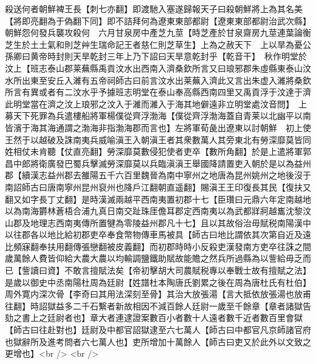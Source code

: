 殺送何者朝鮮裨王長【刺七亦翻】即渡馳入塞遂歸報天子曰殺朝鮮將上為其名美【將即亮翻為于偽翻下同】即不詰拜何為遼東東部都尉【遼東東部都尉治武次縣】朝鮮怨何發兵襲攻殺何　六月甘泉房中產芝九莖【時芝產於甘泉齋房九莖連葉論衡芝生於土土氣和則芝艸生瑞命記王者慈仁則芝草生】上為之赦天下　上以旱為憂公孫卿曰黄帝時封則天旱乾封三年上乃下詔曰天旱意乾封乎【乾音干】　秋作明堂於汶上【班志泰山郡莱蕪縣禹貢汶水出西南入濟桑欽所言又曰琅邪郡朱虛縣東泰山汶水所出東至安丘入濰有五帝祠師古曰前言汶水出莱蕪入濟此又言出朱虚入濰將桑欽所言有異或者有二汶水乎予據班志明堂在泰山奉高縣西南四里又禹貢浮于汶達于濟此明堂當在濟之汶上琅邪之汶入于濰而濰入于海其地僻遠非立明堂處汶音問】　上募天下死罪為兵遣樓船將軍楊僕從齊浮渤海【僕從齊浮渤海蓋自青莱以北幽平以南皆濱于海其海通謂之渤海非指渤海郡而言也】左將軍荀彘出遼東以討朝鮮　初上使王然于以越破及誅南夷兵威喻滇王入朝滇王者其衆數萬人其旁東北有勞深靡莫皆同姓相仗未肯聽【仗直亮翻】勞深靡莫數侵犯使者吏卒【數所角翻】於是上遣將軍郭昌中郎將衛廣發巴蜀兵擊滅勞深靡莫以兵臨滇滇王舉國降請置吏入朝於是以為益州郡【續漢志益州郡去雒陽五千六百里魏晉為南中寧州之地唐為昆州姚州之地後沒于南詔師古曰唐南寧州昆州裒州也降戶江翻朝直遥翻】賜滇王王印復長其民【復扶又翻又如字長丁丈翻】是時漢滅兩越平西南夷置初郡十七【臣瓚曰元鼎六年定南越地以為南海欝林蒼梧合浦九真日南交趾珠厓儋耳郡定西南夷以為武都牂牁越巂沈黎汶山郡及地理志西南夷傳所置犍為零陵益州郡凡十七】且以其故俗治毋賦税南陽漢中以往郡各以地比給初郡吏卒奉食幣物傳車馬被具【師古曰地比謂依其次第自近及遠比頻寐翻奉扶用翻傳張戀翻被皮義翻】而初郡時時小反殺吏漢發南方吏卒往誅之間歲萬餘人費皆仰給大農大農以均輸調鹽鐵助賦故能贍之然兵所過縣為以訾給毋乏而已【訾讀曰資】不敢言擅賦法矣【帝初擊胡大司農賦税專以奉戰士故有擅賦之法】　是歲以御史中丞南陽杜周為廷尉【姓譜杜本陶唐氏劉累之後在周為唐杜氏有杜伯】周外寛内深次骨【李奇曰其用法深刻至骨】其治大放張湯【言大抵依放張湯也放甫往翻】時詔獄益多二千石繫者新故相因不減百餘人廷尉一歲至千餘章【章者諸獄告劾之書上之廷尉者也】章大者連逮證案數百小者數十人遠者數千近者數百里會獄【師古曰往赴對也】廷尉及中都官詔獄逮至六七萬人【師古曰中都官凡京師諸官府也獄辭所及進考問者六七萬人也】吏所增加十萬餘人【師古曰吏又於此外以文致之更增也】<br />
<br />
